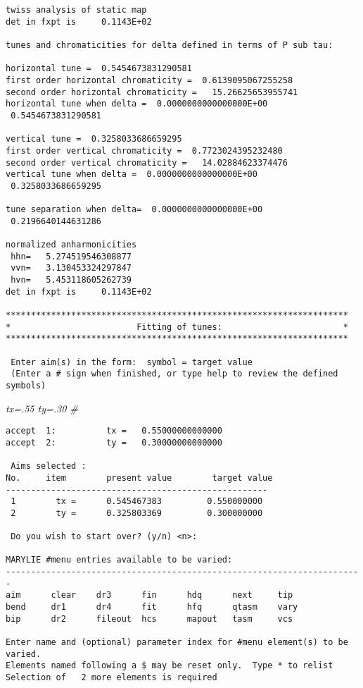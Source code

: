 \begin{footnotesize}
\begin{verbatim}
twiss analysis of static map
det in fxpt is     0.1143E+02

tunes and chromaticities for delta defined in terms of P sub tau:

horizontal tune =  0.5454673831290581
first order horizontal chromaticity =  0.6139095067255258
second order horizontal chromaticity =   15.26625653955741
horizontal tune when delta =  0.0000000000000000E+00
 0.5454673831290581

vertical tune =  0.3258033686659295
first order vertical chromaticity =  0.7723024395232480
second order vertical chromaticity =   14.02884623374476
vertical tune when delta =  0.0000000000000000E+00
 0.3258033686659295

tune separation when delta=  0.0000000000000000E+00
 0.2196640144631286

normalized anharmonicities
 hhn=   5.274519546308877
 vvn=   3.130453324297847
 hvn=   5.453118605262739
det in fxpt is     0.1143E+02

********************************************************************
*                         Fitting of tunes:                        *
********************************************************************

 Enter aim(s) in the form:  symbol = target value
 (Enter a # sign when finished, or type help to review the defined symbols)
\end{verbatim}
\end{footnotesize}
{\em tx=.55 ty=.30 \#}
\begin{footnotesize}
\begin{verbatim}
accept  1:          tx =   0.55000000000000
accept  2:          ty =   0.30000000000000

 Aims selected :
No.     item        present value        target value
----------------------------------------------------
 1        tx =      0.545467383         0.550000000
 2        ty =      0.325803369         0.300000000

 Do you wish to start over? (y/n) <n>:

MARYLIE #menu entries available to be varied:
-----------------------------------------------------------------------
aim      clear    dr3      fin      hdq      next     tip
bend     dr1      dr4      fit      hfq      qtasm    vary
bip      dr2      fileout  hcs      mapout   tasm     vcs

Enter name and (optional) parameter index for #menu element(s) to be varied.
Elements named following a $ may be reset only.  Type * to relist
Selection of   2 more elements is required
\end{verbatim}
\end{footnotesize}
